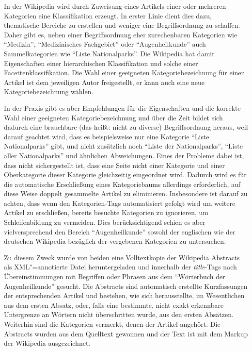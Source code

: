 \documentclass[pagesize,paper=A4,DIV=calc,fontsize=12pt,draft=false]{scrreprt}
\begin{document}
In der Wikipedia wird durch Zuweisung eines Artikels einer oder mehreren Kategorien eine Klassifikation erzeugt. 
In erster Linie dient dies dazu, thematische Bereiche zu erstellen und weniger eine Begriffsordnung zu schaffen. 
Daher gibt es, neben einer Begriffsordnung eher zurechenbaren Kategorien wie \enquote{Medizin}, \enquote{Medizinisches Fachgebiet} oder \enquote{Augenheilkunde} auch Sammelkategorien wie \enquote{Liste Nationalparks}. 
Die Wikipedia hat damit Eigenschaften einer hierarchischen Klassifikation und solche einer Facettenklassifikation. 
Die Wahl einer geeigneten Kategoriebezeichnung für einen Artikel ist dem jeweiligen Autor freigestellt, er kann auch eine neue Kategoriebezeichnung wählen. 

In der Praxis gibt es aber Empfehlungen für die Eigenschaften und die korrekte Wahl einer geeigneten Kategoriebezeichnung und über die Zeit bildet sich dadurch eine brauchbare (das heißt: nicht zu diverse) Begriffsordnung heraus, weil darauf geachtet wird, dass es beispielsweise nur eine Kategorie \enquote{Liste Nationalparks} gibt, und nicht zusätzlich noch \enquote{Liste der Nationalparks}, \enquote{Liste aller Nationalparks} und ähnlichen Abweichungen. 
Eines der Probleme dabei ist, dass nicht sichergestellt ist, dass eine Seite nicht einer Kategorie und einer Oberkategorie dieser Kategorie gleichzeitig eingeordnet wird. 
Dadurch wird es für die automatische Erschließung eines Kategoriebaums allerdings erforderlich, auf diese Weise doppelt gesammelte Artikel zu eliminieren. 
Insbesondere ist darauf zu achten, dass wenn den Kategorien-Tags automatisiert gefolgt wird um weitere Artikel zu erschließen, bereits besuchte Kategorien zu ignorieren, um Schleifenbildung zu vermeiden. 
Dies berücksichtigend schien es aber vielversprechend den Bereich \enquote{Augenheilkunde} sowohl der englischen wie der deutschen Wikipedia bezüglich der vergebenen Kategorien zu untersuchen. 

Zu diesem Zweck wurde von beiden eine Volltextkopie der Wikipedia Abstracts als XML"=annotierte Datei heruntergeladen und innerhalb der \emph{title}-Tags nach Übereinstimmungen mit Begriffen oder Phrasen aus dem \enquote{Wörterbuch der Augenheilkunde} gesucht. 
Die Abstracts sind automatisch erstellte Kurzfassungen der entsprechenden Artikel und bestehen, wie sich herausstellte, im Wesentlichen aus dem ersten Absatz, oder, falls eine bestimmte, nicht exakt erkennbare Untergrenze an Wörtern nicht überschritten wurde, aus den ersten Absätzen. 
Weiterhin sind die Kategorien vermerkt, denen der Artikel angehört. 
Die Abstracts wurden aus dem Quelltext gewonnen und der Text ist mit dem Markup der Wikipedia ausgezeichnet. 
\end{document}
